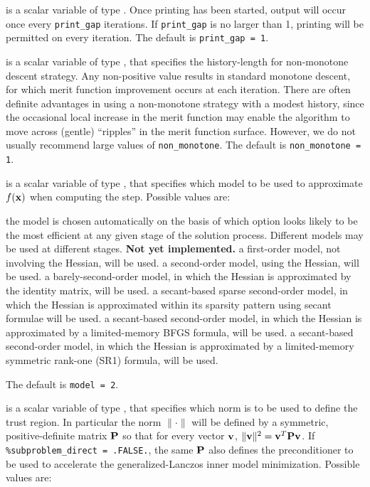 \documentclass{galahad}
\begin{document}
\begin{description}
 is a scalar variable of type \integer.
Once printing has been started, output will occur once every
{\tt print\_gap} iterations. If {\tt print\_gap} is no larger than 1,
printing will be permitted on every iteration.
The default is {\tt print\_gap = 1}.

 is a scalar variable of type \integer, that
specifies the history-length for non-monotone descent strategy.
Any non-positive value results in standard monotone descent, for which
merit function improvement occurs at each iteration. There are often
definite advantages in using a non-monotone strategy with a modest history,
since the occasional local increase in the merit function may
enable the algorithm to move across (gentle) ``ripples'' in
the merit function surface.
However, we do not usually recommend large values of {\tt non\_monotone}.
The default is {\tt non\_monotone = 1}.

 is a scalar variable of type \integer, that specifies
which model to be used to approximate $f({\mathbf{x}})$ when computing the step.
Possible values are:

\begin{description}
 the model is chosen automatically on the basis of which option looks
        likely to be the most efficient at any given stage of the solution
        process. Different models may be used at different stages.
        {\bf Not yet implemented.}
 a first-order model, not involving the Hessian, will be used.
 a second-order model, using the Hessian, will be used.
 a barely-second-order model, in which the Hessian is approximated
        by the identity matrix, will be used.
 a secant-based sparse second-order model, in which the Hessian is
        approximated within its sparsity pattern using secant formulae will
        be used.
 a secant-based second-order model, in which the Hessian is approximated
        by a limited-memory BFGS formula, will be used.
 a secant-based second-order model, in which the Hessian is approximated
        by a limited-memory symmetric rank-one (SR1) formula, will be used.
\end{description}
The default is {\tt model = 2}.

 is a scalar variable of type \integer,
that specifies which norm is to be used to define the trust region.
In particular the norm $\|\cdot\|$ will be defined by a symmetric,
positive-definite matrix ${\mathbf{P}}$ so that for every vector ${\mathbf{v}}$,
$\|{\mathbf{v}}\|^2 = {\mathbf{v}}^T {\mathbf{P}} {\mathbf{v}}$.
If {\tt \%subproblem\_direct = .FALSE.}, the same ${\mathbf{P}}$ also defines the
preconditioner to be used to accelerate the generalized-Lanczos
inner model minimization.  Possible values are:


\end{description}
\end{document}

